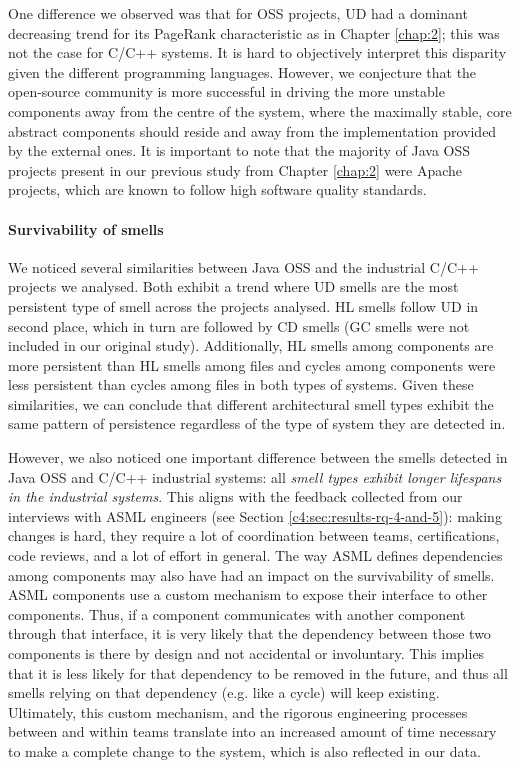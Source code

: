 One difference we observed was that for OSS projects, UD had a dominant decreasing trend for its PageRank characteristic as in Chapter \ref{chap:2}; this was not the case for C/C++ systems.
It is hard to objectively interpret this disparity given the different programming languages. However, we conjecture that the open-source community is more successful in driving the more unstable components away from the centre of the system, where the maximally stable, core abstract components should reside \cite{Martin2018} and away from the implementation provided by the external ones.
It is important to note that the majority of Java OSS projects present in our previous study from Chapter \ref{chap:2} were Apache projects, which are known to follow high software quality standards.

\paragraph{Survivability of smells}
We noticed several similarities between Java OSS and the industrial C/C++ projects we analysed.
Both exhibit a trend where UD smells are the most persistent type of smell across the projects analysed.
HL smells follow UD in second place, which in turn are followed by CD smells (GC smells were not included in our original study).
Additionally, HL smells among components are more persistent than HL smells among files and cycles among components were less persistent than cycles among files in both types of systems.
Given these similarities, we can conclude that different architectural smell types exhibit the same pattern of persistence regardless of the type of system they are detected in.

However, we also noticed one important difference between the smells detected in Java OSS and C/C++ industrial systems: all \emph{smell types exhibit longer lifespans in the industrial systems}. 
This aligns with the feedback collected from our interviews with ASML engineers (see Section \ref{c4:sec:results-rq-4-and-5}): making changes is hard, they require a lot of coordination between teams, certifications, code reviews, and a lot of effort in general.
The way ASML defines dependencies among components may also have had an impact on the survivability of smells. ASML components use a custom mechanism to expose their interface to other components. Thus, if a component communicates with another component through that interface, it is very likely that the dependency between those two components is there by design and not accidental or involuntary. This implies that it is less likely for that dependency to be removed in the future, and thus all smells relying on that dependency (e.g. like a cycle) will keep existing.
Ultimately, this custom mechanism, and the rigorous engineering processes between and within teams translate into an increased amount of time necessary to make a complete change to the system, which is also reflected in our data.

